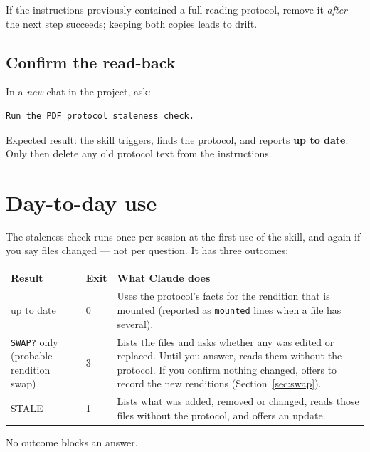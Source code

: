 \documentclass[11pt,a4paper]{article}
\begin{document}
If the instructions previously contained a full reading protocol, remove it
\emph{after} the next step succeeds; keeping both copies leads to drift.

\subsection{Confirm the read-back}

In a \emph{new} chat in the project, ask:
\begin{lstlisting}
Run the PDF protocol staleness check.
\end{lstlisting}
Expected result: the skill triggers, finds the protocol, and reports
\textbf{up to date}. Only then delete any old protocol text from the
instructions.

\section{Day-to-day use}\label{sec:daily}

The staleness check runs once per session at the first use of the skill,
and again if you say files changed --- not per question. It has three
outcomes:

\begin{center}
\small
\begin{tabularx}{\linewidth}{@{}p{3.6cm}p{1.2cm}X@{}}
\toprule
\textbf{Result} & \textbf{Exit} & \textbf{What Claude does} \\
\midrule
up to date & 0 & Uses the protocol's facts for the rendition that is
mounted (reported as \texttt{mounted} lines when a file has several). \\
\texttt{SWAP?} only (probable rendition swap) & 3 & Lists the files and
asks whether any was edited or replaced. Until you answer, reads them
without the protocol. If you confirm nothing changed, offers to record the
new renditions (Section~\ref{sec:swap}). \\
STALE & 1 & Lists what was added, removed or changed, reads those files
without the protocol, and offers an update. \\
\bottomrule
\end{tabularx}
\end{center}

No outcome blocks an answer.
\end{document}
